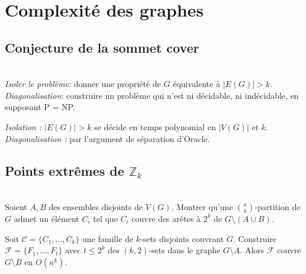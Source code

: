 \section{Complexité des graphes}\label{sec:dm1-complexité}

\subsection{Conjecture de la sommet cover}\label{subsec:dm1-sommet-cover}
\begin{td-exo}[Hypothèse P=NP]\,\\
  \emph{Isoler le problème}: donner une propriété de \(G\) équivalente
  à \(|E(G)| > k\).
  \emph{Diagonalisation}: construire un problème qui n'est ni décidable,
  ni indécidable, en supposant P = NP.
\end{td-exo}

\begin{td-sol}[]
  \emph{Isolation :} \(|E(G)| > k\) se décide en temps polynomial
  en \(|V(G)|\) et \(k\).
  \emph{Diagonalisation :} par l'argument de séparation d'Oracle.
\end{td-sol}

\subsection{Points extrêmes de \(\mathbb{Z}_k\)}\label{subsec:dm1-points-extrêmes}
\begin{td-exo}\,\\
  Soient \(A, B\) des ensembles disjoints de \(V(G)\). Montrer qu'une
  \(\binom{n}{k}\)-partition de \(G\) admet un élément \(C_i\) tel que
  \(C_i\) couvre des arêtes à \(2^k\) de \(G \setminus (A \cup B)\).
\end{td-exo}

\begin{td-sol}[]
  Soit \(\mathcal{C} = \{C_1, \dots, C_k\}\) une famille de \(k\)-sets
  disjoints couvrant \(G\). Construire \(\mathcal{F} = \{F_1, \dots, F_t\}\)
  avec \(t \le 2^k\) des \((k, 2)\)-sets dans le graphe \(G \setminus A\).
  Alors \(\mathcal{F}\) couvre \(G \setminus B\) en \(O(n^k)\).
\end{td-sol}
